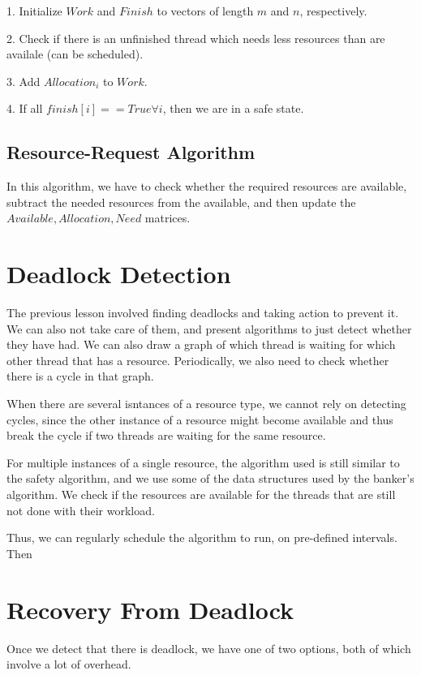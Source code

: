 \documentclass{tufte-handout}
\begin{document}
1. Initialize $Work$ and $Finish$ to vectors of length $m$ and $n$, respectively.

2. Check if there is an unfinished thread which needs less resources than are availale
(can be scheduled).

3. Add  $Allocation_{i}$ to $Work$.

4. If all $finish[i] == True \forall i$, then we are in a safe state.  

\subsection{Resource-Request Algorithm}

In this algorithm, we have to check whether the required resources are available,
subtract the needed resources from the available, and then update the
$Available, Allocation, Need$ matrices.

\section{Deadlock Detection}
The previous lesson involved finding deadlocks and taking action to prevent it.
We can also not take care of them, and present algorithms to just detect whether
they have had. We can also draw a graph of which thread is waiting for which other
thread that has a resource. Periodically, we also need to check whether there 
is a cycle in that graph.

When there are several isntances of a resource type, we cannot rely on detecting 
cycles, since the other instance of a resource might become available and thus
break the cycle if two threads are waiting for the same resource.

For multiple instances of a single resource, the algorithm used is still similar to the
safety algorithm, and we use some of the data structures used by the banker's algorithm.
We check if the resources are available for the threads that are still not done with
their workload.

Thus, we can regularly schedule the algorithm to run, on pre-defined intervals. Then

\section{Recovery From Deadlock}
Once we detect that there is deadlock, we have one of two options, both of which 
involve a lot of overhead.
\end{document}
